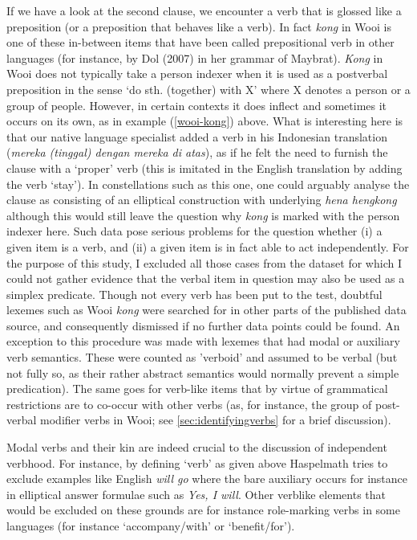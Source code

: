 If we have a look at the second clause, we encounter a verb that is glossed like a preposition (or a preposition that behaves like a verb). In fact \textit{kong} in Wooi is one of these in-between items that have been called prepositional verb in other languages (for instance, by Dol (2007) in her grammar of Maybrat). \textit{Kong} in Wooi does not typically take a person indexer when it is used as a postverbal preposition in the sense `do sth. (together) with X' where X denotes a person or a group of people. However, in certain contexts it does inflect and sometimes it occurs on its own, as in example (\ref{wooi-kong}) above. What is interesting here is that our native language specialist added a verb in his Indonesian translation (\textit{mereka (tinggal) dengan mereka di atas}), as if he felt the need to furnish the clause with a `proper' verb (this is imitated in the English translation by adding the verb `stay'). In constellations such as this one, one could arguably analyse the clause as consisting of an elliptical construction with underlying \textit{hena hengkong} although this would still leave the question why \textit{kong} is marked with the person indexer here. Such data pose serious problems for the question whether (i) a given item is a verb, and (ii) a given item is in fact able to act independently. For the purpose of this study, I excluded all those cases from the dataset for which I could not gather evidence that the verbal item in question may also be used as a simplex predicate. Though not every verb has been put to the test, doubtful lexemes such as Wooi \textit{kong} were searched for in other parts of the published data source, and consequently dismissed if no further data points could be found. An exception to this procedure was made with lexemes that had modal or auxiliary verb semantics. These were counted as 'verboid' and assumed to be verbal (but not fully so, as their rather abstract semantics would normally prevent a simple predication). The same goes for verb-like items that by virtue of grammatical restrictions are to co-occur with other verbs (as, for instance, the group of post-verbal modifier verbs in Wooi; see \ref{sec:identifyingverbs} for a brief discussion).

Modal verbs and their kin are indeed crucial to the discussion of independent verbhood. For instance, by defining `verb' as given above Haspelmath tries to exclude examples like English \textit{will go} where the bare auxiliary occurs for instance in elliptical answer formulae such as \textit{Yes, I will}. Other verblike elements that would be excluded on these grounds are for instance role-marking verbs in some languages (for instance `accompany/with' or `benefit/for'). 

